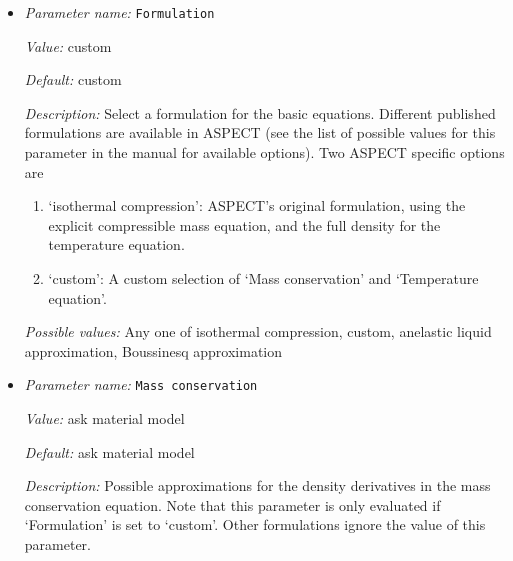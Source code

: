 \begin{itemize}
\item {\it Parameter name:} {\tt Formulation}
\label{parameters:Formulation/Formulation}


{\it Value:} custom


{\it Default:} custom


{\it Description:} Select a formulation for the basic equations. Different published formulations are available in ASPECT (see the list of possible values for this parameter in the manual for available options). Two ASPECT specific options are
\begin{enumerate}
  \item `isothermal compression': ASPECT's original formulation, using the explicit compressible mass equation, and the full density for the temperature equation.
  \item `custom': A custom selection of `Mass conservation' and `Temperature equation'.
\end{enumerate}




{\it Possible values:} Any one of isothermal compression, custom, anelastic liquid approximation, Boussinesq approximation
\item {\it Parameter name:} {\tt Mass conservation}
\label{parameters:Formulation/Mass conservation}


{\it Value:} ask material model


{\it Default:} ask material model


{\it Description:} Possible approximations for the density derivatives in the mass conservation equation. Note that this parameter is only evaluated if `Formulation' is set to `custom'. Other formulations ignore the value of this parameter.



\end{itemize}
